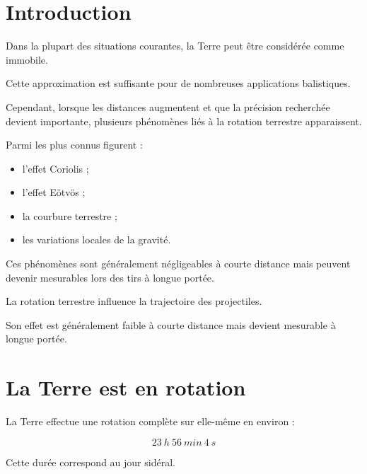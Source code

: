 
\section{Introduction}

Dans la plupart des situations courantes, la Terre peut être considérée comme
immobile.

Cette approximation est suffisante pour de nombreuses applications
balistiques.

Cependant, lorsque les distances augmentent et que la précision recherchée
devient importante, plusieurs phénomènes liés à la rotation terrestre
apparaissent.

Parmi les plus connus figurent :

\begin{itemize}
    \item l'effet Coriolis ;
    \item l'effet Eötvös ;
    \item la courbure terrestre ;
    \item les variations locales de la gravité.
\end{itemize}

Ces phénomènes sont généralement négligeables à courte distance mais peuvent
devenir mesurables lors des tirs à longue portée.

\begin{aretenir}

La rotation terrestre influence la trajectoire des projectiles.

Son effet est généralement faible à courte distance mais devient mesurable à
longue portée.

\end{aretenir}

\section{La Terre est en rotation}

La Terre effectue une rotation complète sur elle-même en environ :

\begin{equation}
23~h~56~min~4~s
\end{equation}

Cette durée correspond au jour sidéral.

